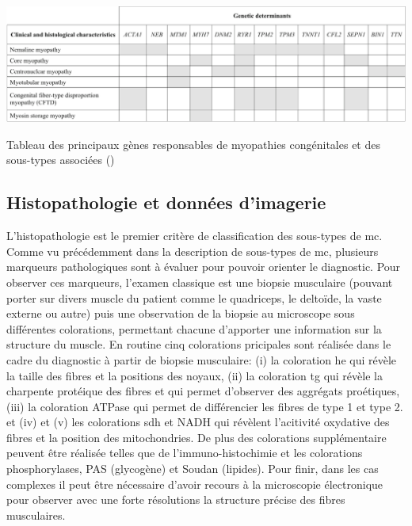 \begin{table}[!ht]
\centering
\includegraphics[width=1\textwidth]{figures/gene_tab.png}
\caption{Tableau des principaux gènes responsables de myopathies congénitales et des sous-types associées (\cite{cassandrini_congenital_2017})}
\label{tab:gene_myo}
\end{table}
\subsection{Histopathologie et données d'imagerie }
L'histopathologie est le premier critère de classification des sous-types de \gls{mc}. Comme vu précédemment dans la description de sous-types de \gls{mc}, plusieurs marqueurs pathologiques sont à évaluer pour pouvoir orienter le diagnostic. Pour observer ces marqueurs, l'examen classique est une biopsie musculaire (pouvant porter sur divers muscle du patient comme le quadriceps, le deltoïde, la vaste externe ou autre) puis une observation de la biopsie au microscope sous différentes colorations, permettant chacune d'apporter une information sur la structure du muscle. En routine cinq colorations pricipales sont réalisée dans le cadre du diagnostic à partir de biopsie musculaire: (i) la coloration \gls{he} qui révèle la taille des fibres et la positions des noyaux, (ii) la coloration \gls{tg} qui révèle la charpente protéique des fibres et qui permet d'observer des aggrégats proétiques, (iii) la coloration ATPase qui permet de différencier les fibres de type 1 et type 2. et (iv) et (v) les colorations \gls{sdh} et NADH qui révèlent l'acitivité oxydative des fibres et la position des mitochondries. De plus des colorations supplémentaire peuvent être réalisée telles que de l'immuno-histochimie et les colorations phosphorylases, PAS (glycogène) et Soudan (lipides). Pour finir, dans les cas complexes il peut être nécessaire d'avoir recours à la microscopie électronique pour observer avec une forte résolutions la structure précise des fibres musculaires.

